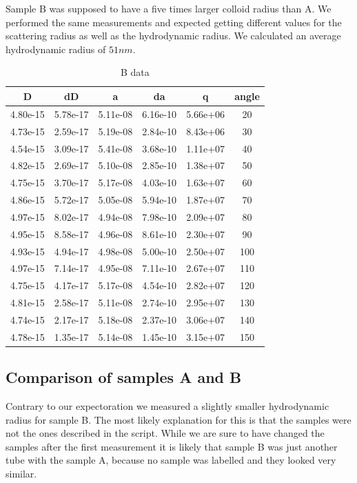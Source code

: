 \documentclass[]{article}
\begin{document}
Sample B was supposed to have a five times larger colloid radius than A. We performed the same measurements and expected getting different values for the scattering radius as well as the hydrodynamic radius. 
We calculated an average hydrodynamic radius of $51 nm$. 



\begin{table}[h]
	\centering
	\begin{tabular}{|c|c|c|c|c|c|}
		\hline
		D & dD & a & da & q & angle \\ \hline\hline
		4.80e-15 & 5.78e-17 & 5.11e-08 & 6.16e-10 & 5.66e+06 & 20 \\ \hline
		4.73e-15 & 2.59e-17 & 5.19e-08 & 2.84e-10 & 8.43e+06 & 30 \\ \hline
		4.54e-15 & 3.09e-17 & 5.41e-08 & 3.68e-10 & 1.11e+07 & 40 \\ \hline
		4.82e-15 & 2.69e-17 & 5.10e-08 & 2.85e-10 & 1.38e+07 & 50 \\ \hline
		4.75e-15 & 3.70e-17 & 5.17e-08 & 4.03e-10 & 1.63e+07 & 60 \\ \hline
		4.86e-15 & 5.72e-17 & 5.05e-08 & 5.94e-10 & 1.87e+07 & 70 \\ \hline
		4.97e-15 & 8.02e-17 & 4.94e-08 & 7.98e-10 & 2.09e+07 & 80 \\ \hline
		4.95e-15 & 8.58e-17 & 4.96e-08 & 8.61e-10 & 2.30e+07 & 90 \\ \hline
		4.93e-15 & 4.94e-17 & 4.98e-08 & 5.00e-10 & 2.50e+07 & 100 \\ \hline
		4.97e-15 & 7.14e-17 & 4.95e-08 & 7.11e-10 & 2.67e+07 & 110 \\ \hline
		4.75e-15 & 4.17e-17 & 5.17e-08 & 4.54e-10 & 2.82e+07 & 120 \\ \hline
		4.81e-15 & 2.58e-17 & 5.11e-08 & 2.74e-10 & 2.95e+07 & 130 \\ \hline
		4.74e-15 & 2.17e-17 & 5.18e-08 & 2.37e-10 & 3.06e+07 & 140 \\ \hline
		4.78e-15 & 1.35e-17 & 5.14e-08 & 1.45e-10 & 3.15e+07 & 150 \\ \hline
		\hline
	\end{tabular}
	\caption{B data}
	\label{tab:bdata}
\end{table}



\subsection{Comparison of samples A and B}
Contrary to our expectoration we measured a slightly smaller hydrodynamic radius for sample B. The most likely explanation for this is that the samples were not the ones described in the script. While we are sure to have changed the samples after the first measurement it is likely that sample B was just another tube with the sample A, because no sample was labelled and they looked very similar.
\end{document}
